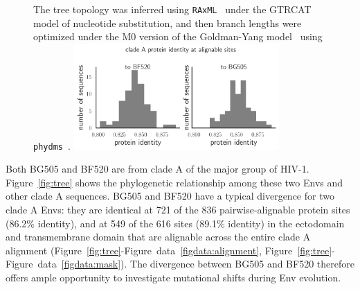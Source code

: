 \documentclass[9pt]{elife}
\begin{document}
\begin{figure}
{The tree topology was inferred using \texttt{RAxML}~\citep{stamatakis2014raxml} under the GTRCAT model of nucleotide substitution, and then branch lengths were optimized under the M0 version of the Goldman-Yang model~\citep{yang2000codon} using \texttt{phydms}~\citep{hilton2017phydms}.
}
{\includegraphics[width=0.7\textwidth]{figures/masked_alignment_identity.pdf}}
\end{figure}

Both BG505 and BF520 are from clade A of the major group of HIV-1.
Figure~\ref{fig:tree} shows the phylogenetic relationship among these two Envs and other clade A sequences.
BG505 and BF520 have a typical divergence for two clade A Envs: they are identical at 721 of the 836 pairwise-alignable protein sites (86.2\% identity), and at 549 of the 616 sites (89.1\% identity) in the ectodomain and transmembrane domain that are alignable across the entire clade A alignment (Figure~\ref{fig:tree}-Figure~data~\ref{figdata:alignment}, Figure~\ref{fig:tree}-Figure~data~\ref{figdata:mask}).
The divergence between BG505 and BF520 therefore offers ample opportunity to investigate mutational shifts during Env evolution.
\end{document}
